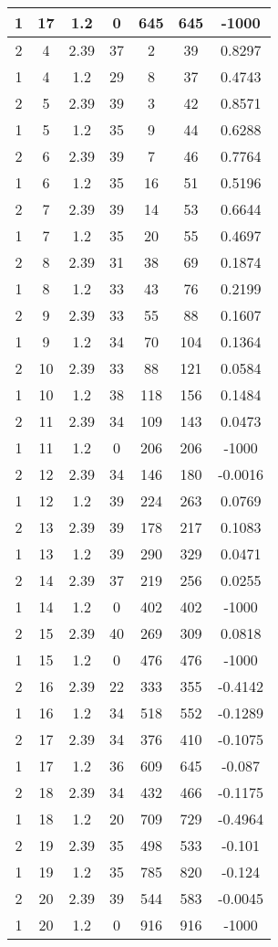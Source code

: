 \documentclass[letterpaper, 12pt]{article}
\begin{document}
\begin{longtable}{|c|c|c|c|c|c|c|}
\hline
1 & 17 & 1.2 & 0 & 645 & 645 & -1000 \\
\hline
2 & 4 & 2.39 & 37 & 2 & 39 & 0.8297 \\
\hline
1 & 4 & 1.2 & 29 & 8 & 37 & 0.4743 \\
\hline
2 & 5 & 2.39 & 39 & 3 & 42 & 0.8571 \\
\hline
1 & 5 & 1.2 & 35 & 9 & 44 & 0.6288 \\
\hline
2 & 6 & 2.39 & 39 & 7 & 46 & 0.7764 \\
\hline
1 & 6 & 1.2 & 35 & 16 & 51 & 0.5196 \\
\hline
2 & 7 & 2.39 & 39 & 14 & 53 & 0.6644 \\
\hline
1 & 7 & 1.2 & 35 & 20 & 55 & 0.4697 \\
\hline
2 & 8 & 2.39 & 31 & 38 & 69 & 0.1874 \\
\hline
1 & 8 & 1.2 & 33 & 43 & 76 & 0.2199 \\
\hline
2 & 9 & 2.39 & 33 & 55 & 88 & 0.1607 \\
\hline
1 & 9 & 1.2 & 34 & 70 & 104 & 0.1364 \\
\hline
2 & 10 & 2.39 & 33 & 88 & 121 & 0.0584 \\
\hline
1 & 10 & 1.2 & 38 & 118 & 156 & 0.1484 \\
\hline
2 & 11 & 2.39 & 34 & 109 & 143 & 0.0473 \\
\hline
1 & 11 & 1.2 & 0 & 206 & 206 & -1000 \\
\hline
2 & 12 & 2.39 & 34 & 146 & 180 & -0.0016 \\
\hline
1 & 12 & 1.2 & 39 & 224 & 263 & 0.0769 \\
\hline
2 & 13 & 2.39 & 39 & 178 & 217 & 0.1083 \\
\hline
1 & 13 & 1.2 & 39 & 290 & 329 & 0.0471 \\
\hline
2 & 14 & 2.39 & 37 & 219 & 256 & 0.0255 \\
\hline
1 & 14 & 1.2 & 0 & 402 & 402 & -1000 \\
\hline
2 & 15 & 2.39 & 40 & 269 & 309 & 0.0818 \\
\hline
1 & 15 & 1.2 & 0 & 476 & 476 & -1000 \\
\hline
2 & 16 & 2.39 & 22 & 333 & 355 & -0.4142 \\
\hline
1 & 16 & 1.2 & 34 & 518 & 552 & -0.1289 \\
\hline
2 & 17 & 2.39 & 34 & 376 & 410 & -0.1075 \\
\hline
1 & 17 & 1.2 & 36 & 609 & 645 & -0.087 \\
\hline
2 & 18 & 2.39 & 34 & 432 & 466 & -0.1175 \\
\hline
1 & 18 & 1.2 & 20 & 709 & 729 & -0.4964 \\
\hline
2 & 19 & 2.39 & 35 & 498 & 533 & -0.101 \\
\hline
1 & 19 & 1.2 & 35 & 785 & 820 & -0.124 \\
\hline
2 & 20 & 2.39 & 39 & 544 & 583 & -0.0045 \\
\hline
1 & 20 & 1.2 & 0 & 916 & 916 & -1000 \\
\hline
\end{longtable}
\end{document}
